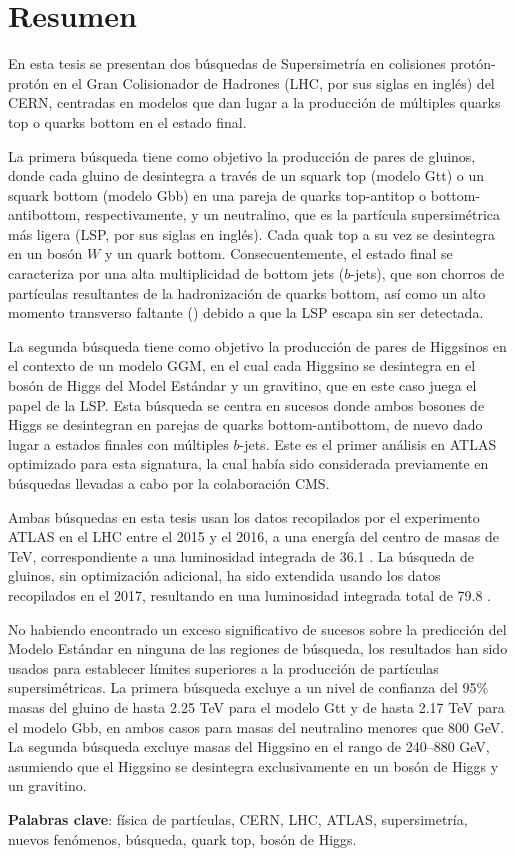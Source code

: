 \chapter*{Resumen}

En esta tesis se presentan dos b\'usquedas de Supersimetr\'ia en colisiones prot\'on-prot\'on en el Gran Colisionador de Hadrones (LHC, por sus siglas en ingl\'es) del CERN,
centradas en modelos que dan lugar a la producci\'on de m\'ultiples quarks top o quarks bottom en el estado final.

La primera b\'usqueda tiene como objetivo la producci\'on de pares de gluinos, donde cada gluino de desintegra a trav\'es de un squark top (modelo Gtt) o un squark  
bottom (modelo Gbb) en una pareja de quarks top-antitop o bottom-antibottom, respectivamente, y un neutralino, que es la part\'icula supersim\'etrica m\'as ligera 
(LSP, por sus siglas en ingl\'es). Cada quak top a su vez se desintegra en un bos\'on $W$ y un quark bottom.
Consecuentemente, el estado final se caracteriza por una alta multiplicidad de bottom jets ($b$-jets), que son chorros de part\'iculas resultantes de
la hadronizaci\'on de quarks bottom, as\'i como un alto momento transverso faltante (\met) debido a que la LSP escapa sin ser detectada. 

La segunda b\'usqueda tiene como objetivo la producci\'on de pares de Higgsinos en el contexto de un modelo GGM, en el cual cada Higgsino 
se desintegra en el bos\'on de Higgs del Model Est\'andar y un gravitino, que en este caso juega el papel de la LSP.
Esta b\'usqueda se centra en sucesos donde ambos bosones de Higgs se desintegran en parejas de quarks bottom-antibottom, de nuevo dado lugar a estados finales 
con m\'ultiples $b$-jets. 
Este es el primer an\'alisis en ATLAS optimizado para esta signatura, la cual hab\'ia sido considerada previamente en b\'usquedas llevadas a cabo por
la colaboraci\'on CMS.

Ambas b\'usquedas en esta tesis usan los datos recopilados por el experimento ATLAS en el LHC 
entre el 2015 y el 2016, a una energ\'ia del centro de masas de \cmtre TeV,
correspondiente a una luminosidad integrada de 36.1 \ifb.
La b\'usqueda de gluinos, sin optimizaci\'on adicional, ha sido extendida usando los datos recopilados en el 2017, resultando en una luminosidad integrada total de 79.8 \ifb.

No habiendo encontrado un exceso significativo de sucesos sobre la predicci\'on del Modelo Est\'andar en ninguna de las regiones de b\'usqueda,
los resultados han sido usados para establecer l\'imites superiores a la producci\'on de part\'iculas supersim\'etricas.
La primera b\'usqueda excluye a un nivel de confianza del 95\% masas del gluino de hasta 2.25 TeV para el modelo Gtt
y de hasta 2.17 TeV para el modelo Gbb, en ambos casos para masas del neutralino menores que 800 GeV.
La segunda b\'usqueda excluye masas del Higgsino en el rango de 240--880 GeV, asumiendo que 
el Higgsino se desintegra exclusivamente en un bos\'on de Higgs y un gravitino.

\par\bigskip
\par\bigskip 
\par\bigskip

\noindent \textbf{Palabras clave}: f\'isica de part\'iculas, CERN, LHC, ATLAS, supersimetr\'ia, nuevos fen\'omenos, b\'usqueda, quark top, bos\'on de Higgs.

